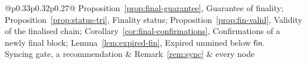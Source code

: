 \documentclass[11pt,a4paper]{article}
\theoremstyle{definition}
\newcommand{\fin}{\mathsf{fin}}
\begin{document}
\begin{table}[p]
\begin{tabular}{@{}p{0.33\linewidth}p{0.32\linewidth}p{0.27\linewidth}@{}}
{  Proposition~\ref{prop:final-guarantee}, Guarantee of finality;
  Proposition~\ref{prop:status-tri}, Finality status;
  Proposition~\ref{prop:fin-valid}, Validity of the finalised chain;
  Corollary~\ref{cor:final-confirmations}, Confirmations of a newly final
  block; Lemma~\ref{lem:expired-fin}, Expired unmined below $\fin$.} \\
\addlinespace
Syncing gate, a recommendation
  & Remark~\ref{rem:sync} & every node \\
 \\
\bottomrule
\end{tabular}
\caption[]{Rules, continued.}
\end{table}
\end{document}
